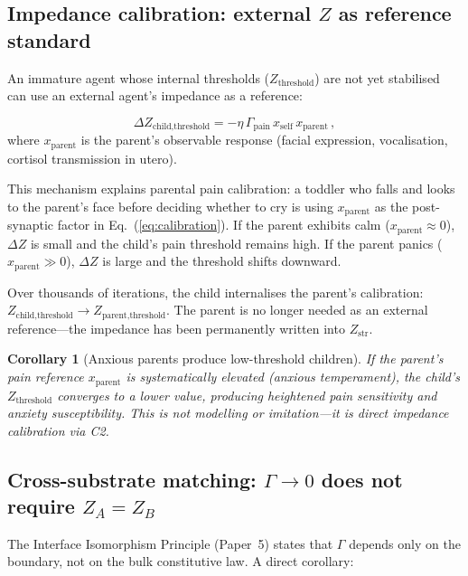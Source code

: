 \documentclass[aps,pre,twocolumn,superscriptaddress,floatfix]{revtex4-2}
\newtheorem{corollary}{Corollary}
\begin{document}
\subsection{Impedance calibration: external $Z$ as reference
  standard}
\label{sec:calibration}

An immature agent whose internal thresholds
($Z_{\text{threshold}}$) are not yet stabilised can use
an external agent's impedance as a reference:

\begin{equation}
  \Delta Z_{\text{child,threshold}} =
    -\eta\,\Gamma_{\text{pain}}\,x_{\text{self}}\,
    x_{\text{parent}}\,,
  \label{eq:calibration}
\end{equation}
where $x_{\text{parent}}$ is the parent's observable
response (facial expression, vocalisation, cortisol
transmission in utero).

This mechanism explains parental pain calibration:
a toddler who falls and looks to the parent's face before
deciding whether to cry is using $x_{\text{parent}}$ as
the post-synaptic factor in Eq.~(\ref{eq:calibration}).
If the parent exhibits calm ($x_{\text{parent}}\approx 0$),
$\Delta Z$ is small and the child's pain threshold remains
high.  If the parent panics ($x_{\text{parent}}\gg 0$),
$\Delta Z$ is large and the threshold shifts downward.

Over thousands of iterations, the child internalises the
parent's calibration:
$Z_{\text{child,threshold}}\to Z_{\text{parent,threshold}}$.
The parent is no longer needed as an external reference---the
impedance has been permanently written into
$Z_{\text{str}}$.

\begin{corollary}[Anxious parents produce low-threshold children]
If the parent's pain reference $x_{\text{parent}}$ is
systematically elevated (anxious temperament), the child's
$Z_{\text{threshold}}$ converges to a lower value,
producing heightened pain sensitivity and anxiety
susceptibility.  This is not modelling or imitation---it
is direct impedance calibration via C2.
\end{corollary}


\subsection{Cross-substrate matching: $\Gamma\to 0$ does not
  require $Z_A = Z_B$}
\label{sec:cross-substrate}

The Interface Isomorphism Principle (Paper~5) states that
$\Gamma$ depends only on the boundary, not on the bulk
constitutive law.  A direct corollary:
\end{document}
